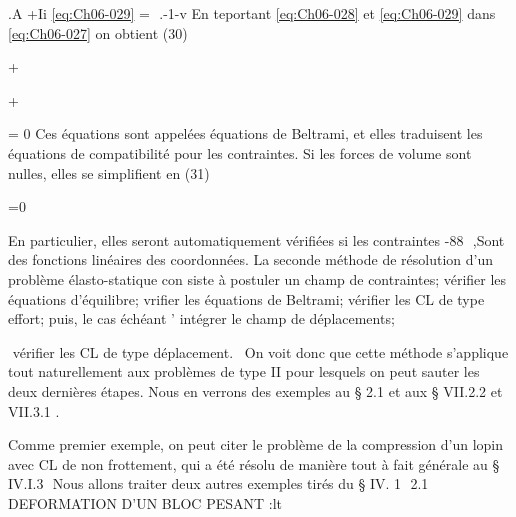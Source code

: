 .A +Ii
\eqref{eq:Ch06-029} 
= ­
.-1-v 
En teportant \eqref{eq:Ch06-028} et \eqref{eq:Ch06-029} dans \eqref{eq:Ch06-027} on obtient 
(30) 

+ 

+ 

= 0 
Ces équations sont appelées équations de Beltrami, et elles traduisent les équations de compatibilité pour les contraintes. Si les forces de volume sont nulles, elles se simplifient en 
(31) 

=0 

En particulier, elles seront automatiquement vérifiées si les contraintes 
-88 ­
,Sont des fonctions linéaires des coordonnées. 
La seconde méthode de résolution d'un problème élasto-statique con­
siste à postuler un champ de contraintes; vérifier les équations d'équilibre; vrifier les équations de Beltrami; vérifier les CL de type effort; 
puis, le cas échéant 
' intégrer le champ de déplacements; 

 vérifier les CL de type déplacement.
\ On voit donc que cette méthode s'applique tout naturellement aux problèmes de type II pour lesquels on peut sauter les deux dernières étapes. Nous en verrons des exemples au § 2.1 et aux § VII.2.2 et VII.3.1 . 

Comme premier exemple, on peut citer le problème de la compression d'un lopin avec CL de non frottement, qui a été résolu de manière tout à fait générale au § IV.I.3  Nous allons traiter deux autres exemples tirés du § IV. 1  
2.1 DEFORMATION D'UN BLOC PESANT 
:lt~ 


